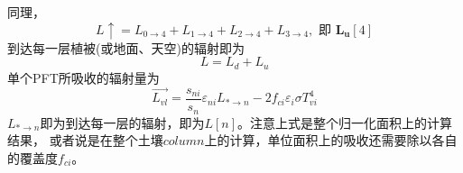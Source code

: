 同理，
\begin{equation}
L \uparrow=L_{0 \rightarrow 4}+L_{1 \rightarrow 4}+L_{2 \rightarrow 4}+L_{3 \rightarrow 4}, \text { 即 } \boldsymbol{L}_{\boldsymbol{u}}[4]
\end{equation}
到达每一层植被(或地面、天空)的辐射即为
\begin{equation}
L=L_{d}+L_{u}
\end{equation}
单个PFT所吸收的辐射量为
\begin{equation}
\overrightarrow{L_{v l}}=\frac{s_{ni}}{s_{n}} \varepsilon_{ni} L_{* \rightarrow n}-2 f_{ci} \varepsilon_{i} \sigma T_{vi}^{4}
\end{equation}
$L_{\ast\rightarrow n}$即为到达每一层的辐射，即为$L[n]$。注意上式是整个归一化面积上的计算结果，
或者说是在整个土壤$column$上的计算，单位面积上的吸收还需要除以各自的覆盖度$f_{ci}$。


